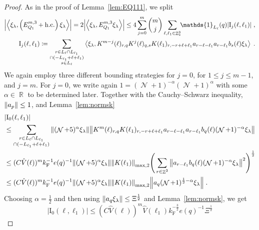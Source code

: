 \documentclass[12pt,a4paper]{article}
\numberwithin{equation}{section}
\newcommand{\1}{\mathbb{I}}
\newcommand{\F}{\mathrm{F}}
\newcommand{\I}{\mathrm{I}}
\DeclareMathOperator{\R}{\mathbb{R}}
\DeclareMathOperator{\Z}{\mathbb{Z}}
\DeclareMathOperator{\NN}{\mathcal{N}}
\newcommand{\half}{\frac{1}{2}}
\newcommand{\eva}[1]{\left\langle #1 \right\rangle}
\theoremstyle{plain}
\theoremstyle{definition}
\theoremstyle{remark}
\theoremstyle{plain}
\theoremstyle{definition}
\theoremstyle{remark}
\begin{document}
\begin{proof}
As in the proof of Lemma~\ref{lem:EQ111}, we split
\begin{equation} \label{eq:EQ1121}
\begin{aligned}
	\abs{\eva{\xi_\lambda,\left(E^{m,3}_{Q_1}+\mathrm{h.c.}\right) \xi_\lambda }} 
	= 2\abs{\eva{\xi_\lambda, E^{m,3}_{Q_1} \xi_\lambda }}
	\le 4 \sum_{j=0}^m {{m}\choose j} \sum_{\ell,\ell_1 \in \Z^3_*}\!\! \mathds{1}_{L_\ell}(q) |\I_j(\ell, \ell_1)| \;,\\
	\I_j(\ell, \ell_1)
	\coloneq \sum_{\substack{r\in L_{\ell} \cap L_{\ell_1}\\ \cap (-L_{\ell_1}+\ell+\ell_1)\\ s \in L_{\ell}}}
		\eva{\xi_\lambda, K^{m-j}(\ell)_{r,q} K^{j}(\ell)_{q,s}K(\ell_1)_{r,-r+\ell+\ell_1} a_{r-\ell-\ell_1} a_{r-\ell_1} b_{s}(\ell) \xi_\lambda} \;. \\
\end{aligned}
\end{equation}
We again employ three different bounding strategies for $ j = 0 $, for $ 1 \le j \le m-1 $, and $ j = m $. For $ j = 0 $, we write again $1 = (\NN+1)^{-\alpha}(\NN+1)^{\alpha}$ with some $\alpha \in \R$ to be determined later. Together with the Cauchy--Schwarz inequality, $ \norm{a_p} \le 1 $, and Lemma~\ref{lem:normsk}
\begin{align}
	&|\I_0(\ell, \ell_1)| \nonumber\\
	&\leq \sum_{\substack{r\in L_{\ell} \cap L_{\ell_1}\\ \cap (-L_{\ell_1}+\ell+\ell_1)}} \norm{ (\NN+5)^{\alpha} \xi_\lambda} \norm{ K^m(\ell )_{r,q} K(\ell_1)_{r,-r+\ell+\ell_1} a_{r-\ell-\ell_1} a_{r-\ell_1} b_{q}(\ell) (\NN+1)^{-\alpha} \xi_\lambda }\nonumber\\
	 &\leq (C \hat{V}(\ell))^m k_{\F}^{-1} e(q)^{-1}
	 	\norm{ (\NN+5)^{\alpha} \xi_\lambda} \norm{K(\ell_1) }_{\max,2}
	 	\Bigg( \sum_{r\in \Z^3} \norm{ a_{r-\ell_1} b_{q}(\ell) (\NN+1)^{-\alpha} \xi_\lambda }^2 \Bigg)^\half \nonumber\\
	 &\leq (C \hat{V}(\ell))^m
	 	k_{\F}^{-1} e(q)^{-1}
	 	\norm{(\NN+5)^{\alpha} \xi_\lambda}
	 	\norm{K(\ell_1) }_{\max,2}
	 	\norm{ a_q (\NN+1)^{\half-\alpha} \xi_\lambda } \;.
\end{align}
Choosing $ \alpha = \half $ and then using $ \norm{ a_q \xi_\lambda} \le \Xi^\half $ and Lemma~\ref{lem:normsk}, we get
\begin{equation}
	|\I_0(\ell, \ell_1)|
	\leq (C \hat{V}(\ell))^m
		\hat{V}(\ell_1)
		k_{\F}^{-\frac 32} e(q)^{-1} \Xi^\half

\end{equation}
\end{proof}
\end{document}
